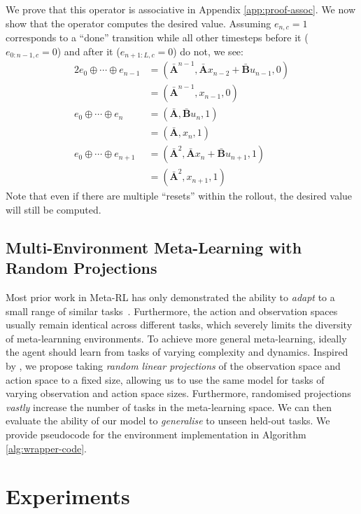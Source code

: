 \documentclass{article}
\newcommand{\newop}{\oplus}
\begin{document}
We prove that this operator is associative in Appendix \ref{app:proof-assoc}. We now show that the operator computes the desired value. Assuming $e_{n,c}=1$ corresponds to a ``done'' transition while all other timesteps before it ($e_{0:n-1,c}=0$) and after it ($e_{n+1:L,c}=0$) do not, we see:
\begin{alignat}{2}
e_0 \newop \cdots \newop e_{n-1} &= (\mathbf{\bar{A}}^{n-1}, \mathbf{\bar{A}} x_{n-2}+ \mathbf{\bar{B}}u_{n-1}, 0) \nonumber \\ \nonumber
&= (\mathbf{\bar{A}}^{n-1}, x_{n-1}, 0)\\ \nonumber
e_0 \newop \cdots \newop e_n &= (\mathbf{\bar{A}}, \mathbf{\bar{B}}u_n, 1) \\ \nonumber
&= (\mathbf{\bar{A}}, x_n, 1)\\ \nonumber
e_0 \newop \cdots \newop e_{n+1} &= (\mathbf{\bar{A}}^2, \mathbf{\bar{A}} x_n + \mathbf{\bar{B}}u_{n+1}, 1) \\ \nonumber
&= (\mathbf{\bar{A}}^2, x_{n+1}, 1)
\end{alignat}
Note that even if there are multiple ``resets'' within the rollout, the desired value will still be computed.
\subsection{Multi-Environment Meta-Learning with Random Projections}
\label{subsec:memlrp}
Most prior work in Meta-RL has only demonstrated the ability to \textit{adapt} to a small range of similar tasks~\citep{beck2023survey}. Furthermore, the action and observation spaces usually remain identical across different tasks, which severely limits the diversity of meta-learnning environments. To achieve more general meta-learning, ideally the agent should learn from tasks of varying complexity and dynamics. Inspired by \citet{kirsch2022general}, we propose taking \textit{random linear projections} of the observation space and action space to a fixed size, allowing us to use the same model for tasks of varying observation and action space sizes. Furthermore, randomised projections \textit{vastly} increase the number of tasks in the meta-learning space. We can then evaluate the ability of our model to \textit{generalise} to unseen held-out tasks.
We provide pseudocode for the environment implementation in Algorithm \ref{alg:wrapper-code}.
\section{Experiments}
\label{sec:Results}
\end{document}
